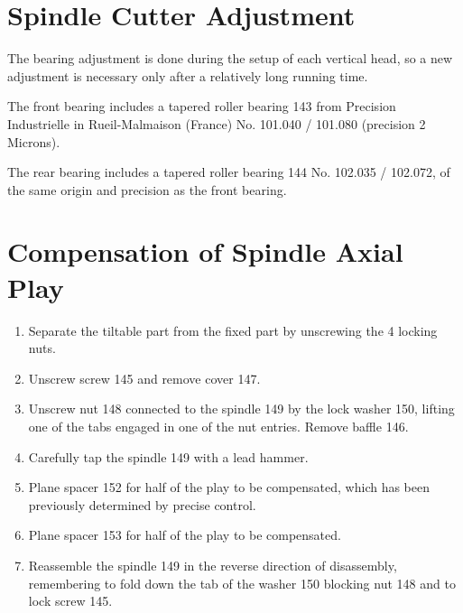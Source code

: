 \section*{Spindle Cutter Adjustment}

The bearing adjustment is done during the setup of each vertical head, so a new adjustment is necessary only after a relatively long running time.

The front bearing includes a tapered roller bearing 143 from Precision Industrielle in Rueil-Malmaison (France) No. 101.040 / 101.080 (precision 2 Microns).

The rear bearing includes a tapered roller bearing 144 No. 102.035 / 102.072, of the same origin and precision as the front bearing.

\section*{Compensation of Spindle Axial Play}

\begin{enumerate}
    \item Separate the tiltable part from the fixed part by unscrewing the 4 locking nuts.
    \item Unscrew screw 145 and remove cover 147.
    \item Unscrew nut 148 connected to the spindle 149 by the lock washer 150, lifting one of the tabs engaged in one of the nut entries. Remove baffle 146.
    \item Carefully tap the spindle 149 with a lead hammer.
    \item Plane spacer 152 for half of the play to be compensated, which has been previously determined by precise control.
    \item Plane spacer 153 for half of the play to be compensated.
    \item Reassemble the spindle 149 in the reverse direction of disassembly, remembering to fold down the tab of the washer 150 blocking nut 148 and to lock screw 145.
\end{enumerate}

